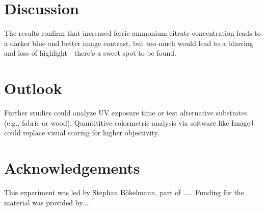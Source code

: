 \documentclass[a4paper,12pt]{article}
\begin{document}
\section{Discussion}
The results confirm that increased ferric ammonium citrate concentration leads to a darker blue and better image contrast, but too much would lead to a blurring and loss of highlight - there's a sweet spot to be found.

\section{Outlook}
Further studies could analyze UV exposure time or test alternative substrates (e.g., fabric or wood). Quantititive colormetric analysis via software like ImageJ could replace visual scoring for higher objectivity.

\section{Acknowledgements}
This experiment was led by Stephan Bökelmann, part of ..... Funding for the material was provided by....
\end{document}
